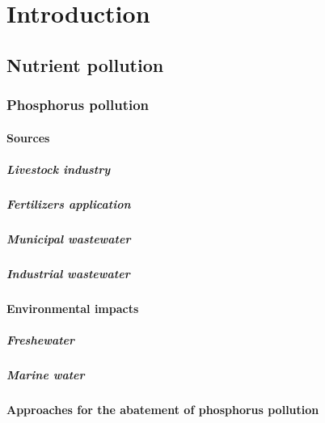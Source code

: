 \chapter{Introduction}\label{ch:introduction}
\section{Nutrient pollution}

\subsection{Phosphorus pollution}

\subsubsection{Sources}

\paragraph{Livestock industry}
\paragraph{Fertilizers application}
\paragraph{Municipal wastewater}
\paragraph{Industrial wastewater}

\subsubsection{Environmental impacts}

\paragraph{Freshewater}
\paragraph{Marine water}

\subsubsection{Approaches for the abatement of phosphorus pollution}


